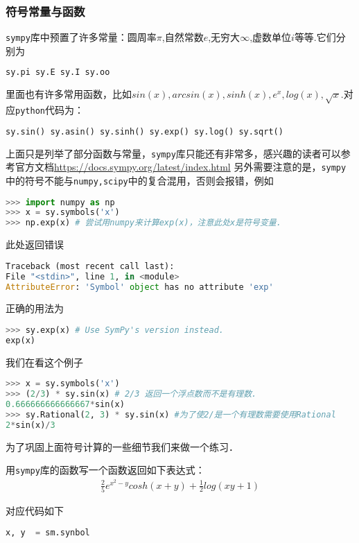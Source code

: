 \subsubsection{符号常量与函数}
\verb|sympy|库中预置了许多常量：圆周率$\pi$,自然常数$e$,无穷大$\infty$,虚数单位$i$等等.它们分别为
\begin{lstlisting}[language=python]
sy.pi sy.E sy.I sy.oo
\end{lstlisting}
里面也有许多常用函数，比如$sin(x), arcsin(x), sinh(x), e^x,
log(x),\sqrt{x}$.对应\verb|python|代码为：
\begin{lstlisting}[language=python]
sy.sin() sy.asin() sy.sinh() sy.exp() sy.log() sy.sqrt()
\end{lstlisting}
上面只是列举了部分函数与常量，\verb|sympy|库只能还有非常多，感兴趣的读者可以参考官方文档\href{https://docs.sympy.org/latest/index.html#}{https://docs.sympy.org/latest/index.html}
另外需要注意的是，\verb|sympy|中的符号不能与\verb|numpy,scipy|中的复合混用，否则会报错，例如
\begin{lstlisting}[language=python]
>>> import numpy as np
>>> x = sy.symbols('x')
>>> np.exp(x) # 尝试用numpy来计算exp(x)，注意此处x是符号变量.
\end{lstlisting}
此处返回错误
\begin{lstlisting}[language=python]
Traceback (most recent call last):
File "<stdin>", line 1, in <module>
AttributeError: 'Symbol' object has no attribute 'exp'
\end{lstlisting}
正确的用法为
\begin{lstlisting}[language=python]
>>> sy.exp(x) # Use SymPy's version instead.
exp(x)
\end{lstlisting}
我们在看这个例子
\begin{lstlisting}[language=python]
>>> x = sy.symbols('x')
>>> (2/3) * sy.sin(x) # 2/3 返回一个浮点数而不是有理数.
0.666666666666667*sin(x)
>>> sy.Rational(2, 3) * sy.sin(x) #为了使2/是一个有理数需要使用Rational
2*sin(x)/3
\end{lstlisting}
为了巩固上面符号计算的一些细节我们来做一个练习．
\begin{example}{}
用\verb|sympy|库的函数写一个函数返回如下表达式：
\begin{align}
\frac{2}{5}e^{x^2-y}cosh(x+y)+\frac{1}{2}log(xy+1)
\end{align}
\end{example}
对应代码如下
\begin{lstlisting}[language=python]
x, y  = sm.synbol
\end{lstlisting}